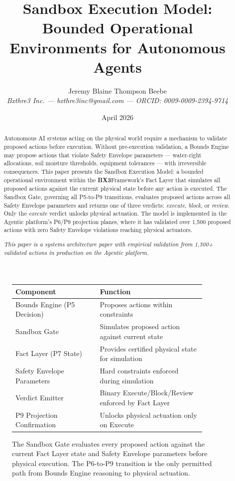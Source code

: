 \documentclass[12pt]{article}
\title{Sandbox Execution Model: Bounded Operational Environments for Autonomous Agents}
\author{Jeremy Blaine Thompson Beebe\\
\textit{Bxthre3 Inc. --- bxthre3inc@gmail.com --- ORCID: 0009-0009-2394-9714}}
\date{April 2026}
\newcommand{\bxthree}{\textbf{BX3}}
\begin{document}
\maketitle

\begin{figure}[htbp]
\centering
\caption{The Sandbox Gate evaluates every proposed action against the current Fact Layer state and Safety Envelope parameters before physical execution. The P6-to-P9 transition is the only permitted path from Bounds Engine reasoning to physical actuation.}
\label{fig:sandbox-gate-arch}
\bigskip
\begin{tabular}{p{0.40\linewidth}p{0.50\linewidth}}
\toprule
\textbf{Component} & \textbf{Function} \\
\midrule
Bounds Engine (P5 Decision) & Proposes actions within constraints \\
\midrule
Sandbox Gate & Simulates proposed action against current state \\
\midrule
Fact Layer (P7 State) & Provides certified physical state for simulation \\
\midrule
Safety Envelope Parameters & Hard constraints enforced during simulation \\
\midrule
Verdict Emitter & Binary Execute/Block/Review enforced by Fact Layer \\
\midrule
P9 Projection Confirmation & Unlocks physical actuation only on Execute \\
\bottomrule
\end{tabular}
\end{figure}

\thispagestyle{fancy}

\begin{abstract}
\noindent
Autonomous AI systems acting on the physical world require a mechanism to validate proposed actions before execution. Without pre-execution validation, a Bounds Engine may propose actions that violate Safety Envelope parameters --- water-right allocations, soil moisture thresholds, equipment tolerances --- with irreversible consequences. This paper presents the Sandbox Execution Model: a bounded operational environment within the \bxthree Framework's Fact Layer that simulates all proposed actions against the current physical state before any action is executed. The Sandbox Gate, governing all P5-to-P9 transitions, evaluates proposed actions across all Safety Envelope parameters and returns one of three verdicts: \textit{execute}, \textit{block}, or \textit{review}. Only the \textit{execute} verdict unlocks physical actuation. The model is implemented in the Agentic platform's P6/P9 projection planes, where it has validated over 1,500 proposed actions with zero Safety Envelope violations reaching physical actuators.

\vspace{0.5em}
\noindent\textit{This paper is a systems architecture paper with empirical validation from 1,500+ validated actions in production on the Agentic platform.}
\end{abstract}
\end{document}

